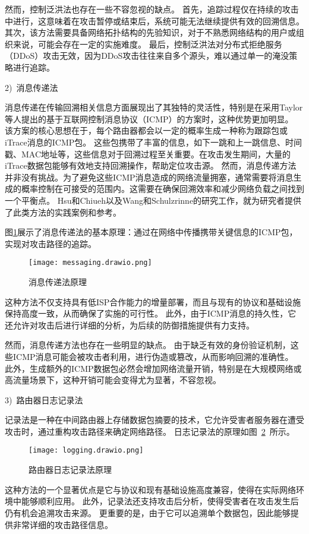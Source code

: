 然而，控制泛洪法也存在一些不容忽视的缺点。
首先，追踪过程仅在持续的攻击中进行，这意味着在攻击暂停或结束后，系统可能无法继续提供有效的回溯信息。
其次，该方法需要具备网络拓扑结构的先验知识，对于不熟悉网络结构的用户或组织来说，可能会存在一定的实施难度。
最后，控制泛洪法对分布式拒绝服务（DDoS）攻击无效，因为DDoS攻击往往来自多个源头，难以通过单一的淹没策略进行追踪。

2)~消息传递法\par
消息传递在传输回溯相关信息方面展现出了其独特的灵活性，特别是在采用Taylor等人提出的基于互联网控制消息协议（ICMP）的方案时，这种优势更加明显\cite{sikos2020packet}。
该方案的核心思想在于，每个路由器都会以一定的概率生成一种称为跟踪包或iTrace消息的ICMP包。
这些包携带了丰富的信息，如下一跳和上一跳信息、时间戳、MAC地址等，这些信息对于回溯过程至关重要。在攻击发生期间，大量的iTrace数据包能够有效地支持回溯操作，帮助定位攻击源。
然而，消息传递方法并非没有挑战。为了避免这些ICMP消息造成的网络流量拥塞，通常需要将消息生成的概率控制在可接受的范围内。这需要在确保回溯效率和减少网络负载之间找到一个平衡点。
Hsu和Chiueh\cite{Hsu2003TrafficSourceIdentification}以及Wang和Schulzrinne\cite{WangSchulzrinne2004DoS,WangSchulzrinne2004ReflectiveDoS}的研究工作，就为研究者提供了此类方法的实践案例和参考。

图\ref{fig:messaging}展示了消息传递法的基本原理：通过在网络中传播携带关键信息的ICMP包，实现对攻击路径的追踪。
\begin{figure}[h]
  \centering
  \texttt{[image: messaging.drawio.png]}
  \caption{消息传递法原理}
  \label{fig:messaging}
\end{figure}
这种方法不仅支持具有低ISP合作能力的增量部署，而且与现有的协议和基础设施保持高度一致，从而确保了实施的可行性。
此外，由于ICMP消息的持久性，它还允许对攻击后进行详细的分析，为后续的防御措施提供有力支持。

然而，消息传递方法也存在一些明显的缺点。
由于缺乏有效的身份验证机制，这些ICMP消息可能会被攻击者利用，进行伪造或篡改，从而影响回溯的准确性。
此外，生成额外的ICMP数据包必然会增加网络流量开销，特别是在大规模网络或高流量场景下，这种开销可能会变得尤为显著，不容忽视。\par

3)~路由器日志记录法\par
记录法是一种在中间路由器上存储数据包摘要的技术，它允许受害者服务器在遭受攻击时，通过重构攻击路径来确定网络路径。
日志记录法的原理如图~\ref{fig:loggging}~所示。
\begin{figure}[htbp]
  \centering
  \texttt{[image: logging.drawio.png]}
  \caption{路由器日志记录法原理}
  \label{fig:loggging}
\end{figure}
这种方法的一个显著优点是它与协议和现有基础设施高度兼容，使得在实际网络环境中能够顺利应用。
此外，记录法还支持攻击后分析，使得受害者在攻击发生后仍有机会追溯攻击来源。
更重要的是，由于它可以追溯单个数据包，因此能够提供非常详细的攻击路径信息。\par

